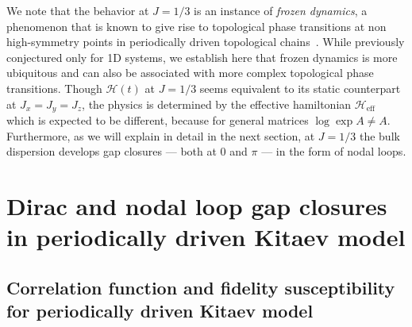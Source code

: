 \documentclass[aps,prb,twocolumn,superscriptaddress,groupedaddress]{revtex4}
\begin{document}
We note that the behavior at $J=1/3$ is an instance of \emph{frozen dynamics}, a phenomenon that is known to give rise to topological phase transitions at non high-symmetry points in periodically driven topological chains~\cite{Molignini:2018,Molignini:2020-multifrequency}.
While previously conjectured only for 1D systems, we establish here that frozen dynamics is more ubiquitous and can also be associated with more complex topological phase transitions.
Though $\mathcal{H}(t)$ at $J=1/3$  seems equivalent to its static counterpart at $J_x=J_y=J_z$,  the physics is determined by  the effective hamiltonian $\mathcal{H}_{\text{eff}}$ which is expected to be different, because for general matrices $\log \exp A \neq A$.
Furthermore, as we will explain in detail in the next section, at $J=1/3$ the bulk dispersion develops gap closures --- both at $0$ and $\pi$ --- in the form of nodal loops.










\section{Dirac and nodal loop gap closures in periodically driven Kitaev model}
\label{sec:NL}

\subsection{ Correlation function and fidelity susceptibility for periodically driven Kitaev model \label{sec:Majorana_Wannier_fidelity_driven}}
\end{document}
